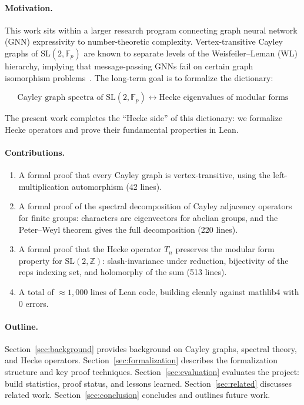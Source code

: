 \documentclass[11pt]{article}
\theoremstyle{plain}
\theoremstyle{definition}
\theoremstyle{remark}
\begin{document}
\paragraph{Motivation.}
This work sits within a larger research program connecting graph neural network (GNN) expressivity to number-theoretic complexity.
Vertex-transitive Cayley graphs of $\mathrm{SL}(2,\mathbb{F}_p)$ are known to separate levels of the Weisfeiler--Leman (WL) hierarchy, implying that message-passing GNNs fail on certain graph isomorphism problems~\cite{grohe2021descriptive}.
The long-term goal is to formalize the dictionary:

\[
\text{Cayley graph spectra of $\mathrm{SL}(2,\mathbb{F}_p)$} \longleftrightarrow \text{Hecke eigenvalues of modular forms}
\]

The present work completes the ``Hecke side'' of this dictionary: we formalize Hecke operators and prove their fundamental properties in Lean.

\paragraph{Contributions.}
\begin{enumerate}
  \item A formal proof that every Cayley graph is vertex-transitive, using the left-multiplication automorphism (42 lines).
  \item A formal proof of the spectral decomposition of Cayley adjacency operators for finite groups: characters are eigenvectors for abelian groups, and the Peter--Weyl theorem gives the full decomposition (220 lines).
  \item A formal proof that the Hecke operator $T_n$ preserves the modular form property for $\mathrm{SL}(2,\mathbb{Z})$: slash-invariance under reduction, bijectivity of the reps indexing set, and holomorphy of the sum (513 lines).
  \item A total of $\approx 1,\!000$ lines of Lean code, building cleanly against mathlib4 with 0 errors.
\end{enumerate}

\paragraph{Outline.}
Section~\ref{sec:background} provides background on Cayley graphs, spectral theory, and Hecke operators.
Section~\ref{sec:formalization} describes the formalization structure and key proof techniques.
Section~\ref{sec:evaluation} evaluates the project: build statistics, proof status, and lessons learned.
Section~\ref{sec:related} discusses related work.
Section~\ref{sec:conclusion} concludes and outlines future work.
\end{document}
